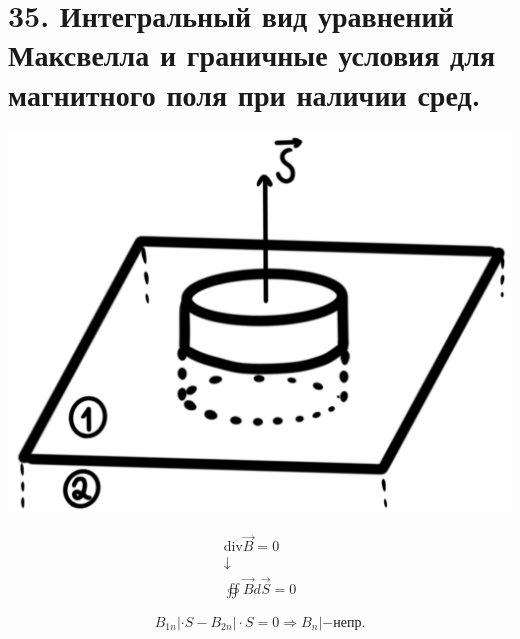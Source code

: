 \section*{35. Интегральный вид уравнений Максвелла и граничные условия для
магнитного поля при наличии сред.}

\begin{minipage}[c]{0.4\textwidth} %
    \includegraphics[width=\textwidth]{im/73.png} %
\end{minipage}%
\hfill
\begin{minipage}[c]{0.7\textwidth} %
    \begin{gather*}
        \mathrm{div}\vec{B}=0 \\
        \downarrow \\
        \oiint \vec{B}d\vec{S}=0 
    \end{gather*}
\end{minipage}

\[
B_{1n}|\cdot S-B_{2n}|\cdot S=0 \Rightarrow \boxed{B_n|-\text{непр.}}
\]

